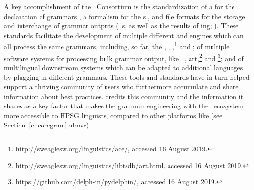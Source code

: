 \documentclass[output=paper
                ,modfonts
                ,nonflat
	        ,collection
	        ,collectionchapter
	        ,collectiontoclongg
 	        ,biblatex
                ,babelshorthands
                ,newtxmath
                ,draftmode
                ,colorlinks, citecolor=brown
]{./langsci/langscibook}
\begin{document}
A key accomplishment of the \delphin\ Consortium is the standardization
of a  for the declaration of grammars
\citep{Copestake:02:CLE}, a formalism for the s
\citep{CFPS2005a}, and file formats for the storage and interchange of
grammar outputs (\eg\ s,
as well as the results of ing; \citealt{Oepen:01,OFTM2004a-u}).
These standards facilitate the development of multiple different
 and  engines which can all process the same grammars,
including, so far,
the  \citep{Copestake2002a},
 \citep{callmeier00},
,\footnote{\url{http://sweaglesw.org/linguistics/ace/}, accessed 16 August 2019.}
and  \citep{Slayden2012a-u};
of multiple software systems for processing bulk grammar output,
like \itsdb\ \citep{Oepen:01},\is{\itsdb}
art,\footnote{\url{http://sweaglesw.org/linguistics/libtsdb/art.html}, accessed 16 August 2019.} and \footnote{\url{https://github.com/delph-in/pydelphin/}, accessed 16 August 2019.};
and of multilingual downstream systems which can be adapted to additional
languages by plugging in different grammars.
These tools and standards have in turn helped support a thriving community
of users who furthermore accumulate and share information about best practices.
\citet[234]{MelnikHandWritten} credits this community and the information it
shares as a key factor that makes the grammar engineering with the
\delphin\ ecosystem more accessible to HPSG linguists, 
compared to other platforms like  (see Section~\ref{cl:coregram} above).
\end{document}
